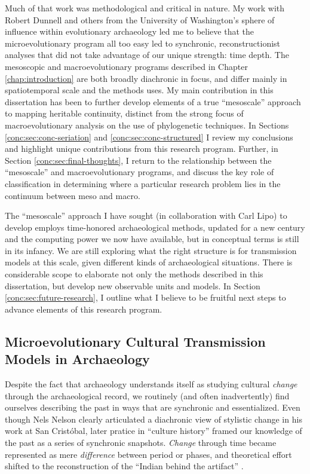 Much of that work was methodological and critical in nature.  My work with Robert Dunnell and others from the University of Washington's sphere of influence within evolutionary archaeology led me to believe that the microevolutionary program all too easy led to synchronic, reconstructionist analyses that did not take advantage of our unique strength:  time depth.  The mesoscopic and macroevolutionary programs described in Chapter \ref{chap:introduction} are both broadly diachronic in focus, and differ mainly in spatiotemporal scale and the methods uses.  My main contribution in this dissertation has been to further develop elements of a true ``mesoscale'' approach to mapping heritable continuity, distinct from the strong focus of macroevolutionary analysis on the use of phylogenetic techniques.  In Sections \ref{conc:sec:conc-seriation} and \ref{conc:sec:conc-structured} I review my conclusions and highlight unique contributions from this research program.  Further, in Section \ref{conc:sec:final-thoughts}, I return to the relationship between the ``mesoscale'' and macroevolutionary programs, and discuss the key role of classification in determining where a particular research problem lies in the continuum between meso and macro. 

The ``mesoscale'' approach I have sought (in collaboration with Carl Lipo) to develop employs time-honored archaeological methods, updated for a new century and the computing power we now have available, but in conceptual terms is still in its infancy.  We are still exploring what the right structure is for transmission models at this scale, given different kinds of archaeological situations.  There is considerable scope to elaborate not only the methods described in this dissertation, but develop new observable units and models.  In Section \ref{conc:sec:future-research}, I outline what I believe to be fruitful next steps to advance elements of this research program.

\subsection{Microevolutionary Cultural Transmission Models in Archaeology}\label{conc:sec:conc-microevolutionary}

Despite the fact that archaeology understands itself as studying cultural \emph{change} through the archaeological record, we routinely (and often inadvertently) find ourselves describing the past in ways that are synchronic and essentialized.  Even though Nels Nelson \citeyearpar{Nelson1916} clearly articulated a diachronic view of stylistic change in his work at San Crist\'obal, later pratice in ``culture history'' framed our knowledge of the past as a series of synchronic snapshots.  \emph{Change} through time became represented as mere \emph{difference} between period or phases, and theoretical effort shifted to the reconstruction of the ``Indian behind the artifact'' \citep[79]{braidwood1959archeology}.  

